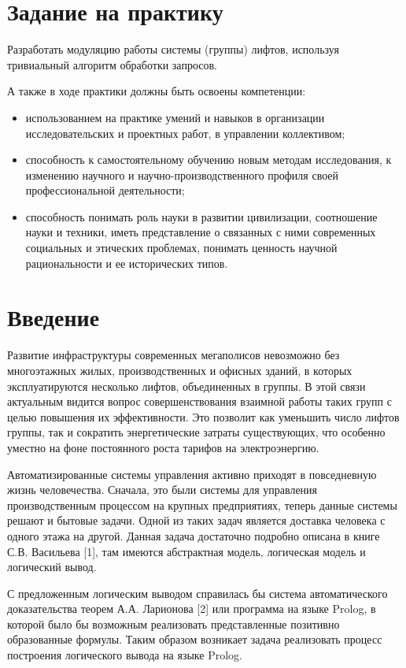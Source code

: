 \section{Задание на практику}
	Разработать модуляцию работы системы (группы) лифтов, используя тривиальный алгоритм обработки запросов.

	А также в ходе практики должны быть освоены компетенции:
		\begin{itemize}
			\item использованием на практике умений и навыков в организации исследовательских и проектных работ, в управлении коллективом;
			\item способность к самостоятельному обучению новым методам исследования, к изменению научного и научно-производственного профиля своей профессиональной деятельности;
			\item способность понимать роль науки в развитии цивилизации, соотношение науки и техники, иметь представление о связанных с ними современных социальных и этических проблемах, понимать ценность научной рациональности и ее исторических типов.
		\end{itemize}

\newpage
\section{Введение}
	Развитие инфраструктуры современных мегаполисов невозможно без многоэтажных жилых, производственных и офисных зданий,
		в которых эксплуатируются несколько лифтов, объединенных в группы. В этой связи актуальным видится вопрос
		совершенствования взаимной работы таких групп с целью повышения их эффективности.
		Это позволит как уменьшить число лифтов группы, так и сократить энергетические затраты существующих,
		что особенно уместно на фоне постоянного роста тарифов на электроэнергию.

Автоматизированные системы управления активно приходят в повседневную жизнь человечества. Сначала, это были системы для управления производственным процессом на крупных предприятиях, теперь данные системы решают и бытовые задачи. Одной из таких задач является доставка человека с одного этажа на другой. Данная задача достаточно подробно описана в книге С.В. Васильева [1], там имеются абстрактная модель, логическая модель и логический вывод.

С предложенным логическим выводом справилась бы система автоматического доказательства теорем А.А. Ларионова [2] или программа на языке Prolog, в которой было бы возможным реализовать представленные позитивно образованные формулы. Таким образом возникает задача реализовать процесс построения логического вывода на языке Prolog.
